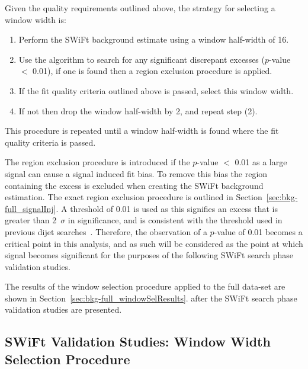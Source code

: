 \noindent
Given the quality requirements outlined above, the strategy for selecting a window width is:
\begin{enumerate}
\item Perform the SWiFt background estimate using a window half-width of 16.
\item Use the \bh{} algorithm to search for any significant discrepant excesses (\mbox{$p$-value} $<$ 0.01),
  if one is found then a region exclusion procedure is applied.
\item If the fit quality criteria outlined above is passed, select this window width.
\item If not then drop the window half-width by 2, and repeat step (2).
\end{enumerate}
This procedure is repeated until a window half-width is found where the fit quality criteria is passed.

The region exclusion procedure is introduced if the \bh{} \mbox{$p$-value} $<$ 0.01 as a large signal can cause a signal induced fit bias.
To remove this bias the region containing the excess is excluded when creating the SWiFt background estimation.
The exact region exclusion procedure is outlined in Section~\ref{sec:bkg-full_signalInj}.
A threshold of 0.01 is used as this signifies an excess that is greater than 2~$\sigma$ in significance,
and is consistent with the threshold used in previous dijet searches~\cite{det-thesis_kate}.
Therefore, the observation of a \bh{} \mbox{$p$-value} of 0.01 becomes a critical point in this analysis,
and as such will be considered as the point at which signal becomes significant for the purposes of the following SWiFt search phase validation studies.

The results of the window selection procedure applied to the full data-set are shown in Section~\ref{sec:bkg-full_windowSelResults}.
after the SWiFt search phase validation studies are presented.



\subsection{SWiFt Validation Studies: Window Width Selection Procedure}
\label{sec:bkg-full_windowSelTests} 

